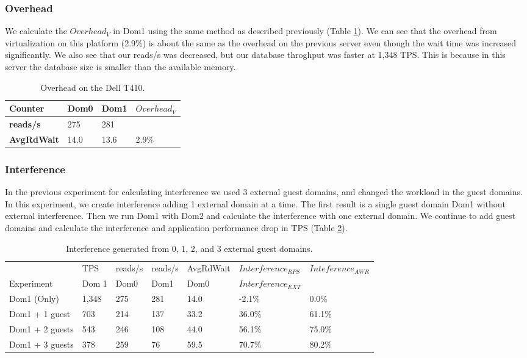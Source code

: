 \subsubsection{Overhead}
We calculate the $Overhead_V$ in Dom1 using the same method as described previously (Table \ref{tab:OverheadDell}).  We can see that the overhead from virtualization on this platform (2.9\%) is about the same as the overhead on the previous server even though the wait time was increased significantly.  We also see that our reads/s was decreased, but our database throghput was faster at 1,348 TPS.  This is because in this server the database size is smaller than the available memory.

\begin{table}[h]
\begin{tabular}{ l l l p{5cm} }
  Counter     & Dom0 & Dom1 & $Overhead_V$ \\
  \hline
    \textbf{reads/s}    & 275  & 281 & \\
    \textbf{AvgRdWait}  & 14.0 & 13.6 & 2.9\% \\ 
  \hline
\end{tabular}
\caption{Overhead on the Dell T410.}
\label{tab:OverheadDell}
\end{table}

\subsubsection{Interference}
In the previous experiment for calculating interference we used 3 external guest domains, and changed the workload in the guest domains.  In this experiment, we create interference adding 1 external domain at a time.  The first result is a single guest domain Dom1 without external interference.  Then we run Dom1 with Dom2 and calculate the interference with one external domain.  We continue to add guest domains and calculate the interference and application performance drop in TPS (Table \ref{tab:domains}).

\begin{table}[!h]
\begin{tabular}{ l l l l l l p{9cm} }
                   & TPS   & reads/s & reads/s & AvgRdWait & $Interference_{RPS}$ & $Inteference_{AWR}$ \\
	Experiment     & Dom 1 & Dom0     & Dom1     & Dom0      & $Interference_{EXT}$ &             \\
	\hline
    Dom1 (Only)     &1,348 & 275      & 281      & 14.0     &  -2.1\%  &   0.0\%   \\
    Dom1 + 1 guest  &  703 & 214      & 137      & 33.2     &  36.0\%  &   61.1\%  \\
    Dom1 + 2 guests &  543 & 246      & 108      & 44.0     &  56.1\%  &   75.0\%    \\
    Dom1 + 3 guests &  378 & 259      &  76      & 59.5     &  70.7\%  &   80.2\%  \\
\end{tabular}
\caption{Interference generated from 0, 1, 2, and 3 external guest domains.}
\label{tab:domains}
\end{table}

